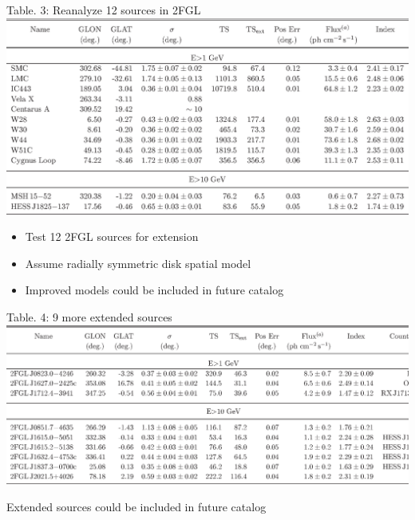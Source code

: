 \documentclass[12pt]{beamer}
\begin{document}
\begin{frame}{Table. 3: Reanalyze 12 sources in 2FGL}
    \includegraphics[scale=0.5]{tables/table3.eps}
  \begin{itemize}
    \item Test 12 2FGL sources for extension
    \item Assume radially symmetric disk spatial model
    \item Improved models could be included in future catalog
  \end{itemize}
\end{frame}

\begin{frame}{Table. 4: 9 more extended sources}
    \includegraphics[scale=0.45]{tables/table4.eps}

    Extended sources could be included in future catalog
\end{frame}
\end{document}
